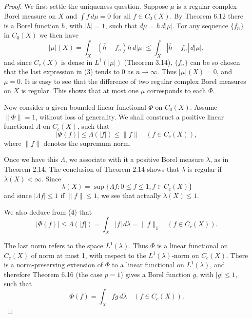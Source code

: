 \begin{proof}
  We first settle the uniqueness question. Suppose $\mu$ is a regular complex Borel measure on $X$ and $\int f \, d\mu = 0$ for all $f \in C_0(X)$. By Theorem 6.12 there is a Borel function $h$, with $|h| = 1$, such that $d\mu = h \, d|\mu|$. For any sequence $\{f_n\}$ in $C_0(X)$ we then have
  \begin{equation}
    |\mu|(X) = \int_X (\bar{h} - f_n)h \, d|\mu| \leq \int_X |\bar{h} - f_n| \, d|\mu|, \tag{3}
  \end{equation}
  and since $C_c(X)$ is dense in $L^1(|\mu|)$ (Theorem 3.14), $\{f_n\}$ can be so chosen that the last expression in (3) tends to 0 as $n \to \infty$. Thus $|\mu|(X) = 0$, and $\mu = 0$. It is easy to see that the difference of two regular complex Borel measures on $X$ is regular. This shows that at most one $\mu$ corresponds to each $\Phi$.

  Now consider a given bounded linear functional $\Phi$ on $C_0(X)$. Assume $\|\Phi\| = 1$, without loss of generality. We shall construct a positive linear functional $\Lambda$ on $C_c(X)$, such that
  \begin{equation}
    |\Phi(f)| \leq \Lambda(|f|) \leq \|f\| \quad (f \in C_c(X)), \tag{4}
  \end{equation}
  where $\|f\|$ denotes the supremum norm.

  Once we have this $\Lambda$, we associate with it a positive Borel measure $\lambda$, as in Theorem 2.14. The conclusion of Theorem 2.14 shows that $\lambda$ is regular if $\lambda(X) < \infty$. Since
  \begin{equation}
    \lambda(X) = \sup \{\Lambda f : 0 \leq f \leq 1, f \in C_c(X)\}
  \end{equation}
  and since $|\Lambda f| \leq 1$ if $\|f\| \leq 1$, we see that actually $\lambda(X) \leq 1$.

  We also deduce from (4) that
  \begin{equation}
    |\Phi(f)| \leq \Lambda(|f|) = \int_X |f| \, d\lambda = \|f\|_1 \quad (f \in C_c(X)). \tag{5}
  \end{equation}

  The last norm refers to the space $L^1(\lambda)$. Thus $\Phi$ is a linear functional on $C_c(X)$ of norm at most 1, with respect to the $L^1(\lambda)$-norm on $C_c(X)$. There is a norm-preserving extension of $\Phi$ to a linear functional on $L^1(\lambda)$, and therefore Theorem 6.16 (the case $p = 1$) gives a Borel function $g$, with $|g| \leq 1$, such that
  \begin{equation}
    \Phi(f) = \int_X fg \, d\lambda \quad (f \in C_c(X)). \tag{6}
  \end{equation}


\end{proof}
